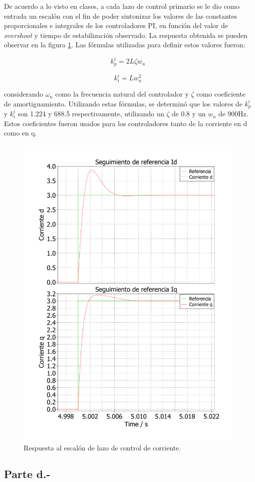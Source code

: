 De acuerdo a lo visto en clases, a cada lazo de control primario se le dio como entrada un escalón con el fin de poder sintonizar los valores de las constantes proporcionales e integrales de los controladores PI, en función del valor de \textit{overshoot} y tiempo de estabilización observado. La respuesta obtenida se pueden observar en la figura \ref{step_response_ccl}. Las fórmulas utilizadas para definir estos valores fueron:

\begin{equation}
    k_p^i = 2L\zeta w_{n}
\end{equation}

\begin{equation}
    k_i^i = Lw_{n}^2
\end{equation}

considerando $\omega_n$ como la frecuencia natural del controlador y $\zeta$ como coeficiente de amortiguamiento. Utilizando estas fórmulas, se determinó que los valores de $k_p^i$ y $k_i^i$ son 1.224 y 688.5 respectivamente, utilizando un $\zeta$ de 0.8 y un $w_{n}$ de 900Hz. Estos coeficientes fueron usados para los controladores tanto de la corriente en d como en q.

\begin{figure}
   \centering
   \includegraphics[width=0.5\linewidth]{Tarea 1/report/imagenes/p1c/respuesta_escalon_ccl.pdf}
   \caption{Respuesta al escalón de lazo de control de corriente.}
   \label{step_response_ccl}
\end{figure}

\subsection{Parte d.-}

